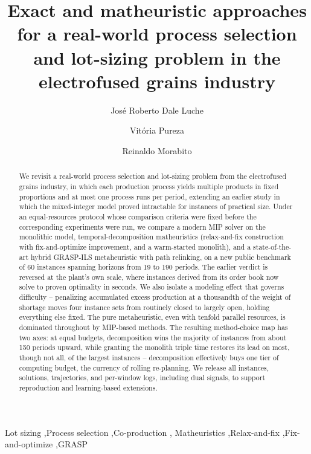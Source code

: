 \documentclass[review,authoryear]{elsarticle}
\begin{document}
\begin{frontmatter}

\title{Exact and matheuristic approaches for a real-world process
selection and lot-sizing problem in the electrofused grains industry}

\author[unesp]{Jos\'e Roberto Dale Luche}
\author[ufscar]{Vit\'oria Pureza}
\author[ufscar]{Reinaldo Morabito}
\address[unesp]{S\~ao Paulo State University (UNESP), Guaratinguet\'a, SP, Brazil} %
\address[ufscar]{Department of Production Engineering, Federal University of S\~ao Carlos (UFSCar), S\~ao Carlos, SP, Brazil}

\begin{abstract}
We revisit a real-world process selection and lot-sizing problem
from the electrofused grains industry, in which each production
process yields multiple products in fixed proportions and at most
one process runs per period, extending an earlier study in which the
mixed-integer model proved intractable for instances of practical
size. Under an equal-resources protocol whose comparison criteria
were fixed before the corresponding experiments were run, we compare
a modern MIP solver on
the monolithic model, temporal-decomposition matheuristics
(relax-and-fix construction with fix-and-optimize improvement, and
a warm-started monolith), and a state-of-the-art hybrid GRASP-ILS
metaheuristic with path relinking, on a new public benchmark of 60
instances spanning horizons from 19 to 190 periods. The earlier verdict is
reversed at the plant's own scale, where instances derived from its
order book now solve to proven optimality in seconds. We also
isolate a modeling effect that governs difficulty -- penalizing
accumulated excess production at a thousandth of the weight of
shortage moves four instance sets from routinely closed to largely
open, holding everything else fixed. The pure metaheuristic,
even with tenfold parallel resources, is dominated throughout by
MIP-based methods. The resulting method-choice map has two axes:
at equal budgets, decomposition wins the majority of instances from
about 150 periods upward, while granting the monolith triple time
restores its lead on most, though not all, of the largest
instances -- decomposition effectively buys one tier of computing
budget, the currency of rolling re-planning. We release all
instances, solutions, trajectories, and per-window logs, including
dual signals, to support reproduction and learning-based extensions.
\end{abstract}

\begin{keyword}
Lot sizing \sep Process selection \sep Co-production \sep
Matheuristics \sep Relax-and-fix \sep Fix-and-optimize \sep GRASP
\end{keyword}

\end{frontmatter}
\end{document}
